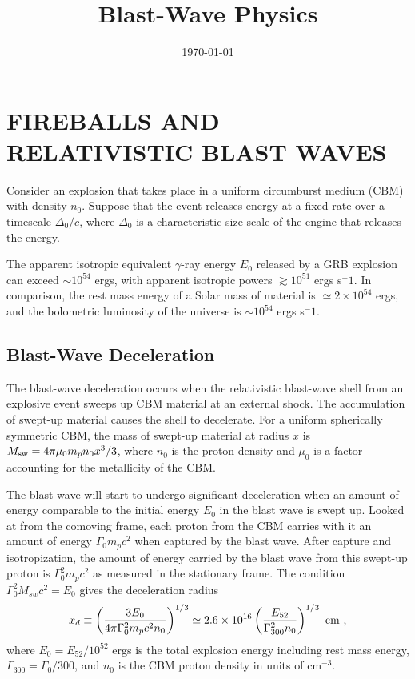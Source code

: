 \documentclass[12pt,a4paper]{article}
\title{Blast-Wave Physics}
\author{}
\date{\today}
\begin{document}
\maketitle

\section{FIREBALLS AND RELATIVISTIC BLAST WAVES}
\cite{2009herb.book.....D} Consider an explosion that takes place in a uniform circumburst medium (CBM) with density $n_0$. Suppose that the event releases energy at a fixed rate over a timescale $\Delta_0/c$, where $\Delta_0$ is a characteristic size scale of the engine that releases the energy. 

The apparent isotropic equivalent $\gamma$-ray energy $E_0$ released by
a GRB explosion can exceed $\sim 10^{54}$ ergs, with apparent isotropic powers $\gtrsim 10^{51}$ ergs s${^-1}$. In comparison, the rest mass energy of a Solar mass of material is $\simeq 2\times 10^{54}$ ergs, and the bolometric luminosity of the universe is $\sim 10^{54}$ ergs s${^-1}$.


\subsection{Blast-Wave Deceleration}
The blast-wave deceleration occurs when the relativistic blast-wave shell from an explosive event sweeps up CBM material at an external shock. The accumulation of swept-up material causes the shell to decelerate. For a uniform spherically symmetric CBM, the mass of swept-up material at radius $x$ is $M_{\rm sw} = 4\pi \mu_0 m_p n_0 x^3/3$, where $n_0$ is the proton density and $\mu_0$ is a factor accounting for the metallicity of the CBM.

The blast wave will start to undergo significant deceleration when an amount of energy comparable to the initial energy $E_0$ in the blast wave is swept up. Looked at from the comoving frame, each proton from the CBM carries with it an amount of energy $\Gamma_0 m_p c^2$ when captured by the blast wave. After capture and isotropization, the amount of energy carried by the blast
wave from this swept-up proton is $\Gamma_0^2 m_p c^2$ as measured in the stationary frame. The condition $\Gamma_0^2 M_{sw} c^2 = E_0$ gives the deceleration radius
\begin{align}
x_d \equiv \left(\dfrac{3E_0}{4\pi \Gamma_0^2 m_p c^2 n_0} \right)^{1/3} \simeq 2.6 \times 10^{16} \left(\dfrac{E_{52}}{\Gamma_{300}^2 n_0} \right)^{1/3} ~\rm cm ~,
\end{align}
where $E_0 = E_{52}/10^{52}$ ergs is the total explosion energy including rest mass energy, $\Gamma_{300} = \Gamma_0/300$, and $n_0$ is the CBM proton density in units of cm$^{-3}$.
\end{document}
